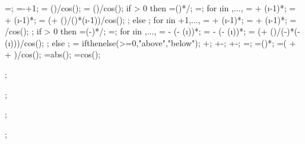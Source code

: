 {{\rightendarrno=\loadarrownumbermo;
\nrightarrows=\rightendarrno-\rightstartarrno+1;
 = (\loadarrowheightleft)/cos(\extraangle);
\loadarrowheight{\loadarrownumber} = (\loadarrowheightright)/cos(\extraangle);
if \nleftarrows > 0 then {
\leftendarrratio=()*\loadwxvalue/\loaddxaleft;
\dahleftend=\leftendarrratio*\dahleft;
for \i in {\leftstartarrno,...,{\leftendarrno}}{
\loadxvalue{\i} =  + (\i-1)*\loadwxvalue;
\loadyvalue{\i} =  + (\i-1)*\loadwyvalue;
\loadarrowheight{\i} = (\loadarrowheightleft + (\dahleftend)/()*(\i-1))/cos(\extraangle);
};} else {};
for \i in {{\leftendarrno+1},...,{}}{
	\loadxvalue{\i} =  + (\i-1)*\loadwxvalue;
	\loadyvalue{\i} =  + (\i-1)*\loadwyvalue;
	\loadarrowheight{\i} = \loadarrowheightmid/cos(\extraangle);
};
if \nrightarrows > 0 then {
\rightstartarrratio=(\loadarrownumber-\rightstartarrno)*\loadwxvalue/\loaddxaright;
\dahrightstart=\rightstartarrratio*\dahright;
for \i in {{\rightendarrno},...,{\rightstartarrno}}{
\loadxvalue{\i} = \loadxvalue{\loadarrownumber} - (\loadarrownumber - (\i))*\loadwxvalue;
\loadyvalue{\i} = \loadyvalue{\loadarrownumber} - (\loadarrownumber - (\i))*\loadwyvalue;
\loadarrowheight{\i} = (\loadarrowheightright + (\dahrightstart)/(\loadarrownumber-\rightstartarrno)*(\loadarrownumber - (\i)))/cos(\extraangle);
};} else {};
\loc = ifthenelse(\loadarrowheightleft>=0,"above","below");
+\loadangle;
+\loadangle-\extraangle;
+\loadangle-\extraangle;
\ninetya=\ninetyfac*\ninetydim;
\ninetyb=()*\ninetydim;
\totanglen=(\loadarrowheight{\drawanglei} + \angsp + \anglen)/cos(\extraangle);
\absextraangle=abs(\extraangle);
\cosextang=cos(\extraangle);
}

;

;

;

;



}
